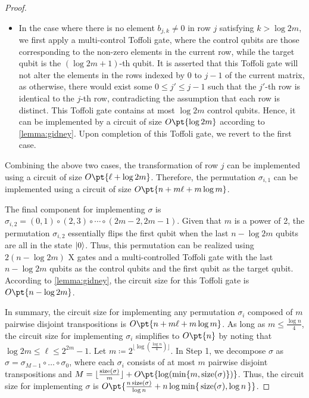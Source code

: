\documentclass[a4paper,UKenglish,cleveref, autoref, thm-restate]{lipics-v2021}
\DeclarePairedDelimiter\cbra{\{}{\}}
\DeclarePairedDelimiter\floor{\lfloor}{\rfloor}
\newcommand{\bo}{O\pt}
\begin{document}
\begin{proof}
\begin{itemize}
    \item In the case where there is no element $b_{j, k} \neq 0$ in row $j$ satisfying $k > \log 2m$, we first apply a multi-control Toffoli gate, where the control qubits are those corresponding to the non-zero elements in the current row, while the target qubit is the $(\log 2m + 1)$-th qubit. It is asserted that this Toffoli gate will not alter the elements in the rows indexed by  $0$ to $j-1$ of the current matrix, as otherwise, there would exist some $0 \leq j' \leq j -1$ such that the $j'$-th row is identical to the $j$-th row, contradicting the assumption that each row is distinct. This Toffoli gate contains at most $\log 2m$ control qubits. Hence, it can be implemented by a circuit of size $\bo{\log 2m}$ according to \cref{lemma:gidney}. Upon completion of this Toffoli gate, we revert to the first case.
\end{itemize}
Combining the above two cases, the transformation of row $j$ can be implemented using a circuit of size $\bo{\ell + \log 2m}$. Therefore, the permutation $\sigma_{i,1}$ can be implemented using a circuit of  size $\bo{n + m\ell + m\log m}$.

The final component for implementing $\sigma$ is $\sigma_{i, 2} = (0, 1) \circ (2, 3) \circ \cdots \circ (2m-2, 2m-1)$. Given that $m$ is a power of 2, the permutation $\sigma_{i, 2}$ essentially flips the first qubit when the last $n - \log 2m$ qubits are all in the state $\ket{0}$. Thus, this permutation can be realized using $2(n - \log 2m)$ X gates and a multi-controlled Toffoli gate with the last $n-\log 2m$ qubits as the control qubits and the first qubit as the target qubit. According to \cref{lemma:gidney}, the circuit size for this Toffoli gate is $\bo{n - \log 2m}$.

In summary, the circuit size for implementing any permutation $\sigma_i$ composed of $m$ pairwise disjoint transpositions is $\bo{n + m\ell + m\log m}$. As long as $m \leq \frac{\log n}{4}$, the circuit size for implementing $\sigma_i$ simplifies to $\bo{n}$ by noting that $\log 2m \leq \ell \leq 2^{2m}-1$. Let $m \coloneqq 2^{\lfloor{\log \left({\frac{\log n}{4}}\right)}\rfloor}$.
In Step 1, we decompose $\sigma$ as $\sigma = \sigma_{M-1} \circ \dots \circ \sigma_0$, where each $\sigma_i$ consists of at most $m$ pairwise disjoint transpositions and $M = \floor{\frac{\mathrm{size}(\sigma)}{m}} + \bo{\log (\min\cbra{m, \mathrm{size}(\sigma)})}$. Thus, the circuit size for implementing $\sigma$ is $\bo{\frac{n\,\mathrm{size}(\sigma)}{\log n} + n\log\min\{\,\mathrm{size}(\sigma), \log n\,\}}$.
\end{proof}
\end{document}
